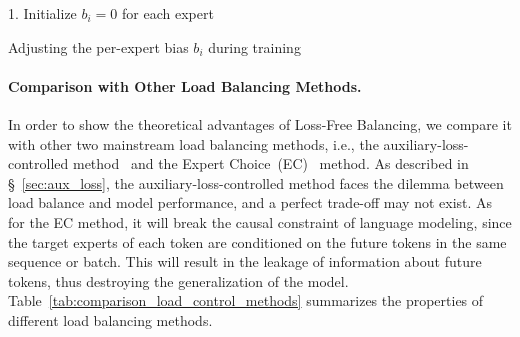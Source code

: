 \documentclass{article} %
\newcommand{\ours}{Loss-Free Balancing}
\begin{document}
\begin{algorithm}[t]
\SetAlgoLined
1. Initialize $b_i = 0$ for each expert\;

\caption{Adjusting the per-expert bias ${b}_i$ during training}
\label{algo:PID_gate}
\end{algorithm}



\paragraph{Comparison with Other Load Balancing Methods.}

In order to show the theoretical advantages of \ours{}, we compare it with other two mainstream load balancing methods, i.e., the auxiliary-loss-controlled method~\citep{Lepikhin2020GShardSG,Fedus2021SwitchTS} and the Expert Choice~(EC)~\citep{Zhou2022MixtureofExpertsWE} method. 
As described in \S~\ref{sec:aux_loss}, the auxiliary-loss-controlled method faces the dilemma between load balance and model performance, and a perfect trade-off may not exist. 
As for the EC method, it will break the causal constraint of language modeling, since the target experts of each token are conditioned on the future tokens in the same sequence or batch. 
This will result in the leakage of information about future tokens, thus destroying the generalization of the model. 
Table~\ref{tab:comparison_load_control_methods} summarizes the properties of different load balancing methods.
\end{document}
